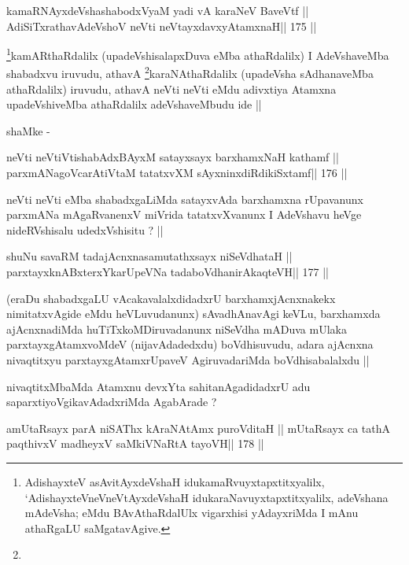 \begin{shl}
kamaRNAyxdeVshashabodxV\s yaM yadi vA karaNeV BaveVtf ||
AdiSiTxrathavA\s\s deVshoV neVti neVtayxdavxyAtamxnaH\hfill || 175 ||
\end{shl}

\begin{artha}
\footnote[1]{AdishayxteV asAvitAyxdeVshaH idukamaRvuyxtapxtitxyalilx,
  `AdishayxteV\s neVneVtAyxdeVshaH idukaraNavuyxtapxtitxyalilx,
  adeVshana mAdeVsha; eMdu BAvAthaRdalUlx vigarxhisi yAdayxriMda I
  mAnu athaRgaLU saMgatavAgive.}kamARthaRdalilx (upadeVshisalapxDuva eMba athaRdalilx) I
AdeVshaveMba shabadxvu iruvudu, athavA \footnote[2]{}karaNAthaRdalilx
(upadeVsha sAdhanaveMba athaRdalilx) iruvudu, athavA neVti neVti eMdu
adivxtiya Atamxna upadeVshiveMba athaRdalilx adeVshaveMbudu ide ||

shaMke -
\end{artha}

\begin{shl}
neVti neVtiVtishabAdxBAyxM satayxsayx barxhamxNaH kathamf ||
parxmANagoVcarAtiVtaM tatatxvXM sAyxninxdiRdikiSxtamf\hfill || 176 ||
\end{shl}

\begin{artha}
neVti neVti eMba shabadxgaLiMda satayxvAda barxhamxna rUpavanunx
parxmANa mAgaRvanenxV miVrida tatatxvXvanunx I AdeVshavu heVge
nideRVshisalu udedxVshisitu ? ||
\end{artha}

\begin{shl}
shuNu savaRM tadajAcnxnasamutathxsayx niSeVdhataH ||
parxtayxknABxterxYkarUpeVNa tadaboVdhanirAkaqteVH\hfill || 177 ||
\end{shl}

\begin{artha}
(eraDu shabadxgaLU vAcakavalalxdidadxrU barxhamxjAcnxnakekx
  nimitatxvAgide eMdu heVLuvudanunx) sAvadhAnavAgi keVLu, barxhamxda
  ajAcnxnadiMda huTiTxkoMDiruvadanunx niSeVdha mADuva mUlaka
  parxtayxgAtamxvoMdeV (nijavAdadedxdu)  boVdhisuvudu, adara ajAcnxna
  nivaqtitxyu parxtayxgAtamxrUpaveV AgiruvadariMda boVdhisabalalxdu ||
\end{artha}

\begin{artha}
nivaqtitxMbaMda Atamxnu devxYta sahitanAgadidadxrU adu
saparxtiyoVgikavAdadxriMda AgabArade ?
\end{artha}

\begin{shl}
amUtaRsayx parA niSAThx kAraNAtAmx puroVditaH ||
mUtaRsayx ca tathA paqthivxV madheyxV saMkiVNaRtA tayoVH\hfill || 178 ||
\end{shl}

